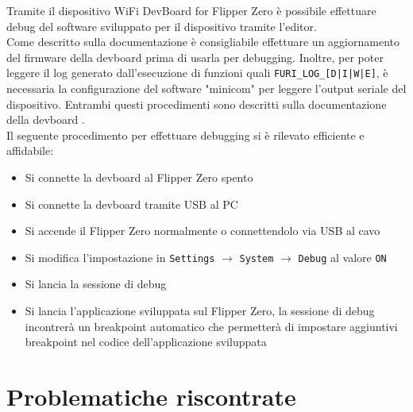 Tramite il dispositivo WiFi DevBoard for Flipper Zero è possibile effettuare debug del software sviluppato per il dispositivo tramite l'editor.\\
Come descritto sulla documentazione è consigliabile effettuare un aggiornamento del firmware della devboard prima di usarla per debugging. Inoltre, per poter leggere il log generato dall'esecuzione di funzioni quali \texttt{FURI\_LOG\_[D|I|W|E]}, è necessaria la configurazione del software "minicom" per leggere l'output seriale del dispositivo. Entrambi questi procedimenti sono descritti sulla documentazione della devboard \cite{devboard}.\\
Il seguente procedimento per effettuare debugging si è rilevato efficiente e affidabile:
\begin{itemize}
  \item Si connette la devboard al Flipper Zero spento
  \item Si connette la devboard tramite USB al PC
  \item Si accende il Flipper Zero normalmente o connettendolo via USB al cavo
  \item Si modifica l'impostazione in \texttt{Settings} \(\rightarrow\) \texttt{System} \(\rightarrow\) \texttt{Debug} al valore \texttt{ON}
  \item Si lancia la sessione di debug
  \item Si lancia l'applicazione sviluppata sul Flipper Zero, la sessione di debug incontrerà un breakpoint automatico che permetterà di impostare aggiuntivi breakpoint nel codice dell'applicazione sviluppata
\end{itemize}

\section{Problematiche riscontrate}
\label{sec:flip_probs}

